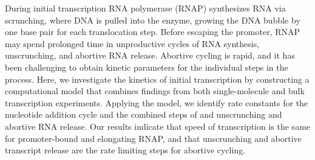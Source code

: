 During initial transcription RNA polymerase (RNAP) synthesizes RNA via
scrunching, where DNA is pulled into the enzyme, growing the DNA bubble by one
base pair for each translocation step. Before escaping the promoter, RNAP
may spend prolonged time in unproductive cycles of RNA synthesis,
unscrunching, and abortive RNA release. Abortive cycling is rapid,
and it has been challenging to obtain kinetic parameters for the individual
steps in the process. Here, we investigate the kinetics of initial
transcription by constructing a computational model that combines
findings from both single-molecule and bulk transcription experiments.
Applying the model, we identify rate constants for the nucleotide addition
cycle and the combined steps of and unscrunching and abortive RNA release. Our
results indicate that speed of transcription is the same for promoter-bound
and elongating RNAP, and that unscrunching and abortive transcript release are
the rate limiting steps for abortive cycling.
